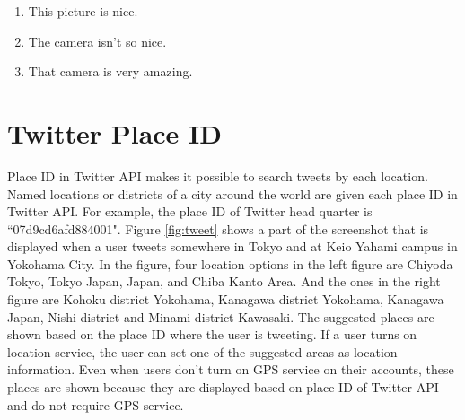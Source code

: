 \begin{enumerate}
	\item This picture is nice.
	\item The camera isn't so nice.
	\item That camera is very amazing.
\end{enumerate}



\begin{comment}
\section{Multi-Class Classification}\label{sec:multi_class_clf} 
\subsection{Support Vector Machine}
one vs. one and one vs. all
equations ??
\subsection{Random Forest}
equations and the explanation
\end{comment}

\section{Twitter Place ID}\label{sec:placeid}
Place ID in Twitter API \cite{twitter_api_placeid} makes it possible to search tweets by each location. 
Named locations or districts of a city around the world are given each place ID in Twitter API.
For example, the place ID of Twitter head quarter is ``07d9cd6afd884001".
Figure \ref{fig:tweet} shows a part of the screenshot that is displayed when a user tweets somewhere in Tokyo and at Keio Yahami campus in Yokohama City.
In the figure, four location options in the left figure are Chiyoda Tokyo, Tokyo Japan, Japan, and Chiba Kanto Area.
And the ones in the right figure are Kohoku district Yokohama, Kanagawa district Yokohama, Kanagawa Japan, Nishi district and Minami district Kawasaki.
The suggested places are shown based on the place ID where the user is tweeting.
If a user turns on location service, the user can set one of the suggested areas as location information. 
Even when users don't turn on GPS service on their accounts, these places are shown because they are displayed based on place ID of Twitter API and do not require GPS service.

